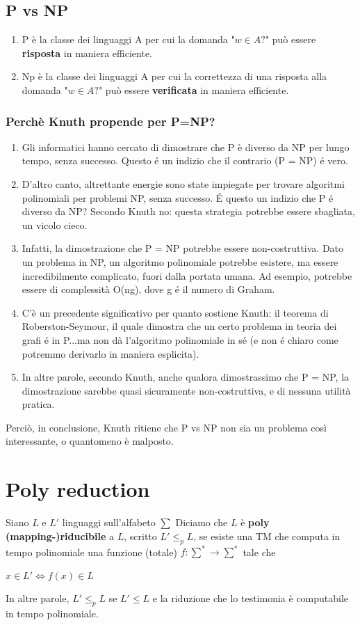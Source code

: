 \documentclass[a4paper, 12pt]{article}
\begin{document}
\subsection{P vs NP}
\begin{enumerate}
\item P \`e la classe dei linguaggi A per cui la domanda "$w \in A?$" pu\`o essere \textbf{risposta} in maniera efficiente.
\item Np \`e la classe dei linguaggi A per cui la correttezza di una risposta alla domanda "$w \in A?$" pu\`o essere \textbf{verificata} in maniera efficiente.
\end{enumerate}
\subsubsection{Perch\`e Knuth propende per P=NP?}
\begin{enumerate}
\item Gli informatici hanno cercato di dimostrare che P è diverso da NP per lungo tempo, senza successo. Questo é un indizio che il contrario (P = NP) é vero.
\item D’altro canto, altrettante energie sono state impiegate per trovare algoritmi polinomiali per problemi NP, senza successo. É questo un indizio che P é diverso da NP? Secondo Knuth no: questa strategia potrebbe essere sbagliata, un vicolo cieco.
\item Infatti, la dimostrazione che P = NP potrebbe essere non-costruttiva. Dato un problema in NP, un algoritmo polinomiale potrebbe esistere, ma essere incredibilmente complicato, fuori dalla portata umana. Ad esempio, potrebbe essere di complessità O(ng), dove g é il numero di Graham.
\item C’è un precedente significativo per quanto sostiene Knuth: il teorema di Roberston-Seymour, il quale dimostra che un certo problema in teoria dei grafi é in P...ma non dà l’algoritmo polinomiale in sé (e non é chiaro come potremmo
derivarlo in maniera esplicita).
\item In altre parole, secondo Knuth, anche qualora dimostrassimo che P = NP, la dimostrazione sarebbe quasi sicuramente non-costruttiva, e di nessuna utilità pratica.
\end{enumerate}
Perci\`o, in conclusione, Knuth ritiene che P vs NP non sia un problema cos\`i interessante, o quantomeno \`e malposto.

\section{Poly reduction}
Siano $L$ e $L'$ linguaggi sull'alfabeto $\sum$ Diciamo che $L$ \`e \textbf{poly (mapping-)riducibile} a $L$, scritto $L' \leq_p L$, se esiste una TM che computa in tempo polinomiale una funzione (totale) $f: \sum^{*} \rightarrow \sum^{*}$ tale che \begin{center}
$x \in L' \iff f(x) \in L$
\end{center}
In altre parole, $L' \leq_p L$ se $L' \leq L$ e la riduzione che lo testimonia \`e computabile in tempo polinomiale.
\end{document}
